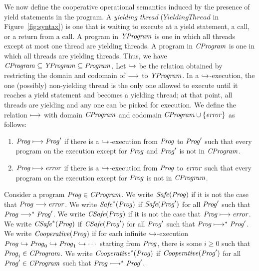 We now define the cooperative operational semantics induced by the presence of yield statements in the program.
A {\em yielding thread\/} ($\mathit{YieldingThread}$ in Figure~\ref{fig:syntax}) is one that is waiting to execute at a yield statement,
a call, or a return from a call.
A program in $\mathit{YProgram}$ is one in which all threads except at most one thread are yielding threads.
A program in $\mathit{CProgram}$ is one in which all threads are yielding threads.
Thus, we have $\mathit{CProgram} \subseteq \mathit{YProgram} \subseteq \mathit{Program}$.
Let $\hookrightarrow$ be the relation obtained by restricting the domain and codomain of $\longrightarrow$ to $\mathit{YProgram}$.
In a $\hookrightarrow$-execution, the one (possibly) non-yielding thread is the only one allowed to execute until it reaches 
a yield statement and becomes a yielding thread; at that point, all threads are yielding and any one can be picked for execution.
We define the relation $\longmapsto$ with domain $\mathit{CProgram}$ and codomain $\mathit{CProgram} \cup \{\mathit{error}\}$ as follows:
\begin{enumerate}
\item 
$\mathit{Prog} \longmapsto \mathit{Prog}'$ if there is a $\hookrightarrow$-execution from $\mathit{Prog}$ to $\mathit{Prog}'$ such that every program on the execution 
except for $\mathit{Prog}$ and $\mathit{Prog}'$ is not in $\mathit{CProgram}$.
\item
$\mathit{Prog} \longmapsto \mathit{error}$ if there is a $\hookrightarrow$-execution from $\mathit{Prog}$ to $\mathit{error}$ such that every program on the execution 
except for $\mathit{Prog}$ is not in $\mathit{CProgram}$.
\end{enumerate}

Consider a program $\mathit{Prog} \in \mathit{CProgram}$.
We write $\mathit{Safe}(\mathit{Prog})$ if it is not the case that $\mathit{Prog} \longrightarrow \mathit{error}$.
We write $\mathit{Safe}^*(\mathit{Prog})$ if $\mathit{Safe}(\mathit{Prog}')$ for all $\mathit{Prog}'$ such that $\mathit{Prog} \longrightarrow^* \mathit{Prog}'$.
We write $\mathit{CSafe}(\mathit{Prog})$ if it is not the case that $\mathit{Prog} \longmapsto \mathit{error}$.
We write $\mathit{CSafe}^*(\mathit{Prog})$ if $\mathit{CSafe}(\mathit{Prog}')$ for all $\mathit{Prog}'$ such that $\mathit{Prog} \longmapsto^* \mathit{Prog}'$.
We write $\mathit{Cooperative}(\mathit{Prog})$ if for each infinite $\hookrightarrow$-execution $\mathit{Prog} \hookrightarrow \mathit{Prog}_0 \hookrightarrow \mathit{Prog}_1 \hookrightarrow \cdots$ 
starting from $\mathit{Prog}$, there is some $i \geq 0$ such that $\mathit{Prog}_i \in \mathit{CProgram}$.
We write $\mathit{Cooperative}^*(\mathit{Prog})$ if $\mathit{Cooperative}(\mathit{Prog}')$ for all $\mathit{Prog}' \in \mathit{CProgram}$ such that $\mathit{Prog} \longmapsto^* \mathit{Prog}'$.


